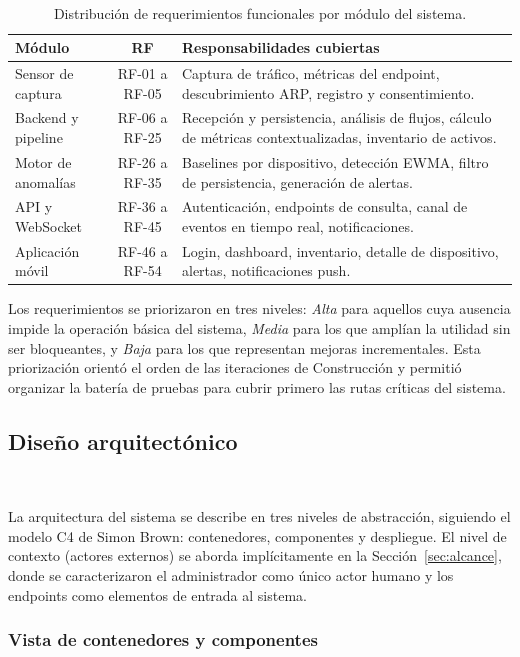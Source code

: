 \begin{table}[ht]
\centering
\caption{Distribución de requerimientos funcionales por módulo del sistema.}
~\label{tab:rf-resumen}
\begin{tabular}{@{}p{2.3cm}cp{4cm}@{}}
\toprule
\textbf{Módulo} & \textbf{RF} & \textbf{Responsabilidades cubiertas} \\
\midrule
Sensor de captura & RF-01 a RF-05 & Captura de tráfico, métricas del endpoint, descubrimiento ARP, registro y consentimiento. \\[4pt]
Backend y pipeline & RF-06 a RF-25 & Recepción y persistencia, análisis de flujos, cálculo de métricas contextualizadas, inventario de activos. \\[4pt]
Motor de anomalías & RF-26 a RF-35 & Baselines por dispositivo, detección EWMA, filtro de persistencia, generación de alertas. \\[4pt]
API y WebSocket & RF-36 a RF-45 & Autenticación, endpoints de consulta, canal de eventos en tiempo real, notificaciones. \\[4pt]
Aplicación móvil & RF-46 a RF-54 & Login, dashboard, inventario, detalle de dispositivo, alertas, notificaciones push. \\
\bottomrule
\end{tabular}
\end{table}

Los requerimientos se priorizaron en tres niveles: \textit{Alta} para 
aquellos cuya ausencia impide la operación básica del sistema, 
\textit{Media} para los que amplían la utilidad sin ser 
bloqueantes, y \textit{Baja} para los que representan mejoras 
incrementales. Esta priorización orientó el orden de las iteraciones 
de Construcción y permitió organizar la batería de pruebas para 
cubrir primero las rutas críticas del sistema.

\subsection{Diseño arquitectónico}
~\label{subsec:arquitectura}

La arquitectura del sistema se describe en tres niveles de 
abstracción, siguiendo el modelo C4 de Simon Brown: contenedores, 
componentes y despliegue. El nivel de contexto (actores externos) se 
aborda implícitamente en la Sección~\ref{sec:alcance}, donde se 
caracterizaron el administrador como único actor humano y los 
endpoints como elementos de entrada al sistema.

\subsubsection{Vista de contenedores y componentes}

